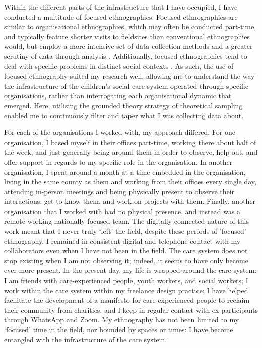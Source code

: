 Within the different parts of the infrastructure that I have occupied, I have conducted a multitude of focused ethnographies. Focused ethnographies are similar to organisational ethnographies, which may often be conducted part-time, and typically feature shorter visits to fieldsites than conventional ethnographies would, but employ a more intensive set of data collection methods and a greater scrutiny of data through analysis \cite{knoblauch_focused_2005}. Additionally, focused ethnographies tend to deal with specific problems in distinct social contexts \cite{wall_focused_2014}. As such, the use of focused ethnography suited my research well, allowing me to understand the way the infrastructure of the children's social care system operated through specific organisations, rather than interrogating each organisational dynamic that emerged. Here, utilising the grounded theory strategy of theoretical sampling \cite{charmaz_constructing_2006, 96} enabled me to continuously filter and taper what I was collecting data about. 

For each of the organisations I worked with, my approach differed. For one organisation, I based myself in their offices part-time, working there about half of the week, and just generally being around them in order to observe, help out, and offer support in regards to my specific role in the organisation. In another organisation, I spent around a month at a time embedded in the organisation, living in the same county as them and working from their offices every single day, attending in-person meetings and being physically present to observe their interactions, get to know them, and work on projects with them. Finally, another organisation that I worked with had no physical presence, and instead was a remote working nationally-focused team. The digitally connected nature of this work meant that I never truly ‘left’ the field, despite these periods of 'focused' ethnography. I remained in consistent digital and telephone contact with my collaborators even when I have not been in the field. The care system does not stop existing when I am not observing it; indeed, it seems to have only become ever-more-present. In the present day, my life is wrapped around the care system: I am friends with care-experienced people, youth workers, and social workers; I work within the care system within my freelance design practice; I have helped facilitate the development of a manifesto for care-experienced people to reclaim their community from charities, and I keep in regular contact with ex-participants through WhatsApp and Zoom. My ethnography has not been limited to my ‘focused’ time in the field, nor bounded by spaces or times: I have become entangled with the infrastructure of the care system.

